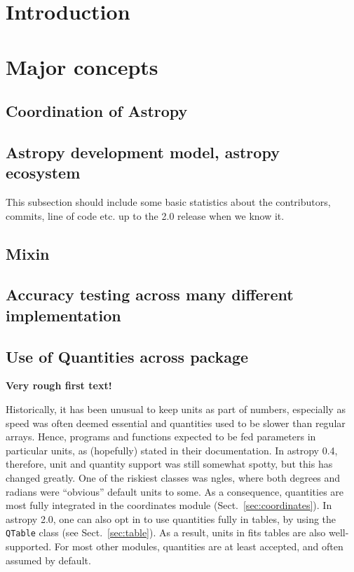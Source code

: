 \documentclass[modern]{aastex61}
\begin{document}
\section{Introduction} \label{sec:intro}


\section{Major concepts}

\subsection{Coordination of Astropy}

\subsection{Astropy development model, astropy ecosystem}
This subsection should include some basic statistics about the contributors, commits, line of code etc. up to the 2.0 release when we know it.

\subsection{Mixin}

\subsection{Accuracy testing across many different implementation}

\subsection{Use of Quantities across package}

{\bf Very rough first text!}

Historically, it has been unusual to keep units as part of numbers, especially as speed was often deemed essential and quantities used to be slower than regular arrays. Hence, programs and functions expected to be fed parameters in particular units, as (hopefully) stated in their documentation.  In astropy 0.4, therefore, unit and quantity support was still somewhat spotty, but this has changed greatly.  One of the riskiest classes was ngles, where both degrees and radians were ``obvious'' default units to some. As a consequence, quantities are most fully integrated in the coordinates module (Sect.~\ref{sec:coordinates}). In astropy 2.0, one can also opt in to use quantities fully in tables, by using the {\tt QTable} class (see Sect.~\ref{sec:table}). As a result, units in fits tables are also well-supported. For most other modules, quantities are at least accepted, and often assumed by default.
\end{document}
